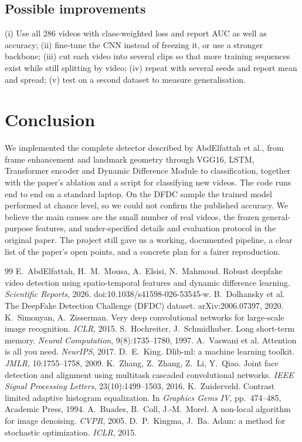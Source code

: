 \documentclass[11pt,a4paper]{article}
\begin{document}
\subsection{Possible improvements}
(i) Use all 286 videos with class-weighted loss and report AUC as well as accuracy; (ii) fine-tune the CNN instead of freezing it, or use a stronger backbone; (iii) cut each video into several clips so that more training sequences exist while still splitting by video; (iv) repeat with several seeds and report mean and spread; (v) test on a second dataset to measure generalisation.

\section{Conclusion}
We implemented the complete detector described by AbdElfattah et al., from frame enhancement and landmark geometry through VGG16, LSTM, Transformer encoder and Dynamic Difference Module to classification, together with the paper's ablation and a script for classifying new videos. The code runs end to end on a standard laptop. On the DFDC sample the trained model performed at chance level, so we could not confirm the published accuracy. We believe the main causes are the small number of real videos, the frozen general-purpose features, and under-specified details and evaluation protocol in the original paper. The project still gave us a working, documented pipeline, a clear list of the paper's open points, and a concrete plan for a fairer reproduction.

\begin{thebibliography}{99}\small
{} E.~AbdElfattah, H.~M.~Mousa, A.~Elsisi, N.~Mahmoud. Robust deepfake video detection using spatio-temporal features and dynamic difference learning. \emph{Scientific Reports}, 2026. doi:10.1038/s41598-026-53545-w.
 B.~Dolhansky et al. The DeepFake Detection Challenge (DFDC) dataset. arXiv:2006.07397, 2020.
 K.~Simonyan, A.~Zisserman. Very deep convolutional networks for large-scale image recognition. \emph{ICLR}, 2015.
 S.~Hochreiter, J.~Schmidhuber. Long short-term memory. \emph{Neural Computation}, 9(8):1735--1780, 1997.
 A.~Vaswani et al. Attention is all you need. \emph{NeurIPS}, 2017.
 D.~E.~King. Dlib-ml: a machine learning toolkit. \emph{JMLR}, 10:1755--1758, 2009.
 K.~Zhang, Z.~Zhang, Z.~Li, Y.~Qiao. Joint face detection and alignment using multitask cascaded convolutional networks. \emph{IEEE Signal Processing Letters}, 23(10):1499--1503, 2016.
 K.~Zuiderveld. Contrast limited adaptive histogram equalization. In \emph{Graphics Gems IV}, pp.\ 474--485, Academic Press, 1994.
 A.~Buades, B.~Coll, J.-M.~Morel. A non-local algorithm for image denoising. \emph{CVPR}, 2005.
 D.~P.~Kingma, J.~Ba. Adam: a method for stochastic optimization. \emph{ICLR}, 2015.
\end{thebibliography}
\end{document}
